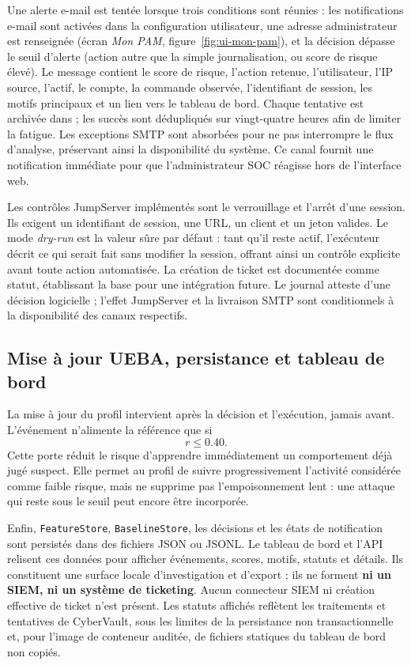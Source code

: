 \documentclass[11pt,a4paper,oneside]{report}
\theoremstyle{definition}
\theoremstyle{plain}
\begin{document}
Une alerte e-mail est tentée lorsque trois conditions sont réunies : les
notifications e-mail sont activées dans la configuration utilisateur, une
adresse administrateur est renseignée (écran \emph{Mon PAM},
figure~\ref{fig:ui-mon-pam}), et la décision dépasse le seuil d'alerte (action
autre que la simple journalisation, ou score de risque élevé). Le message
contient le score de risque, l'action retenue, l'utilisateur, l'IP source,
l'actif, le compte, la commande observée, l'identifiant de session, les motifs
principaux et un lien vers le tableau de bord. Chaque tentative est archivée
dans  ; les succès sont dédupliqués sur vingt-quatre
heures afin de limiter la fatigue. Les exceptions SMTP sont absorbées pour ne
pas interrompre le flux d'analyse, préservant ainsi la disponibilité du
système. Ce canal fournit une notification immédiate pour que
l'administrateur SOC réagisse hors de l'interface web.

Les contrôles JumpServer implémentés sont le verrouillage et l'arrêt d'une
session. Ils exigent un identifiant de session, une URL, un client et un jeton
valides. Le mode \emph{dry-run} est la valeur sûre par défaut : tant qu'il
reste actif, l'exécuteur décrit ce qui serait fait sans modifier la session,
offrant ainsi un contrôle explicite avant toute action automatisée. La
création de ticket est documentée comme statut, établissant la base pour une
intégration future. Le journal atteste d'une décision logicielle ; l'effet
JumpServer et la livraison SMTP sont conditionnels à la disponibilité des
canaux respectifs.

\subsection{Mise à jour UEBA, persistance et tableau de bord}

La mise à jour du profil intervient après la décision et l'exécution, jamais
avant. L'événement n'alimente la référence que si
\[
 r\leq 0.40.
\]
Cette porte réduit le risque d'apprendre immédiatement un comportement déjà
jugé suspect. Elle permet au profil de suivre progressivement l'activité
considérée comme faible risque, mais ne supprime pas l'empoisonnement lent :
une attaque qui reste sous le seuil peut encore être incorporée.

Enfin, \texttt{FeatureStore}, \texttt{BaselineStore}, les décisions et les
états de notification sont persistés dans des fichiers JSON ou JSONL. Le
tableau de bord et l'API relisent ces données pour afficher événements,
scores, motifs, statuts et détails. Ils constituent une surface locale
d'investigation et d'export ; ils ne forment \textbf{ni un SIEM, ni un
système de ticketing}. Aucun connecteur SIEM ni création effective de ticket
n'est présent. Les statuts affichés reflètent les traitements et tentatives
de CyberVault, sous les limites de la persistance non transactionnelle et,
pour l'image de conteneur auditée, de fichiers statiques du tableau de bord
non copiés.
\end{document}
